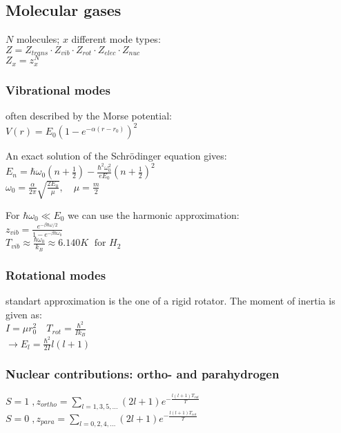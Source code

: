 \subsection*{Molecular gases}
$N$ molecules; $x$ different mode types: \\
$Z = Z_{trans} \cdot Z_{vib} \cdot Z_{rot} \cdot Z_{elec} \cdot Z_{nuc}$ \\
$Z_x = z_x^N$

\subsubsection*{Vibrational modes}
often described by the Morse potential:\\
$V(r) = E_0 \left(1- e^{-\alpha (r-r_0)}\right)^2$

An exact solution of the Schrödinger equation gives:\\
$E_n = \hbar \omega_0 \left(n + \frac{1}{2}\right) - \frac{\hbar^2 \omega_0^2}{e E_0} \left(n + \frac{1}{2}\right)^2$ \\
$\omega_0 = \frac{\alpha}{2 \pi} \sqrt{\frac{2 E_0}{\mu}} , \quad \mu = \frac{m}{2}$

For $\hbar \omega_0 \ll E_0 $ we can use the harmonic approximation:\\
$z_{vib} = \frac{e^{-\beta \hbar \omega /2}}{1- e^{- \beta \hbar \omega_0}}$\\
$T_{vib} \approx \frac{\hbar \omega_0}{k_B} \approx 6.140 K \; \text{ for } H_2$

\subsubsection*{Rotational modes}

standart approximation is the one of a rigid rotator. The moment of inertia is given as: \\
$I = \mu r_0^2 \quad T_{rot} = \frac{\hbar^2}{I k_B}$\\
$\rightarrow E_l = \frac{\hbar^2}{2I} l(l+1)$

\subsubsection*{Nuclear contributions: ortho- and parahydrogen}
$S=1 \; , z_{ortho} = \sum_{l=1,3,5,\dots} (2l +1) e^{- \frac{l(l+1) T_{rot}}{T}}$ \\
$S=0 \; , z_{para} = \sum_{l=0,2,4,\dots} (2l +1) e^{- \frac{l(l+1) T_{rot}}{T}}$

